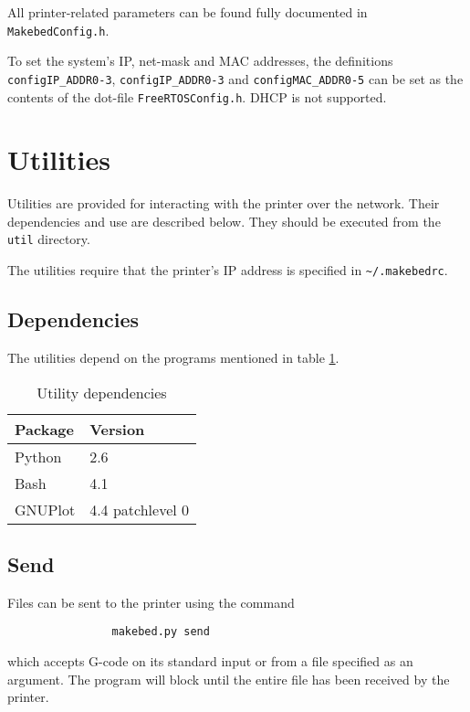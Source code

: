 			All printer-related parameters can be found fully documented in
			\verb|MakebedConfig.h|.
			
			To set the system's IP, net-mask and MAC addresses, the definitions
			\verb|configIP_ADDR0-3|, \verb|configIP_ADDR0-3| and
			\verb|configMAC_ADDR0-5| can be set as the contents of the dot-file
			\verb|FreeRTOSConfig.h|. DHCP is not supported.
			
	
	\section{Utilities}
		
		\label{sec:utilDoc}
		
		Utilities are provided for interacting with the printer over the network.
		Their dependencies and use are described below. They should be executed from
		the \verb|util| directory.
		
		The utilities require that the printer's IP address is specified in
		\verb|~/.makebedrc|.
		
		\subsection{Dependencies}
			
			The utilities depend on the programs mentioned in table
			\ref{tab:utildependencies}.
			
			\begin{table}
				\centering
				\begin{tabular}{l l}
					\toprule
					Package & Version \\
					\midrule
					Python & 2.6 \\
					Bash & 4.1 \\
					GNUPlot & 4.4 patchlevel 0 \\
					\bottomrule
				\end{tabular}
				
				\caption{Utility dependencies}
				\label{tab:utildependencies}
			\end{table}
		
		\subsection{Send}
		
			\label{sec:makebedDoc}
			
			Files can be sent to the printer using the command
			\begin{verbatim}
				makebed.py send
			\end{verbatim}
			which accepts G-code on its standard input or from a file specified as an
			argument. The program will block until the entire file has been received
			by the printer.
			

